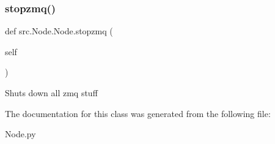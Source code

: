 \subsubsection{\texorpdfstring{stopzmq()}{stopzmq()}}
{\footnotesize\ttfamily def src.\+Node.\+Node.\+stopzmq (\begin{DoxyParamCaption}\item[{}]{self }\end{DoxyParamCaption})}

\begin{DoxyVerb}Shuts down all zmq stuff\end{DoxyVerb}
 

The documentation for this class was generated from the following file\+:\begin{DoxyCompactItemize}
\item 
Node.\+py\end{DoxyCompactItemize}
